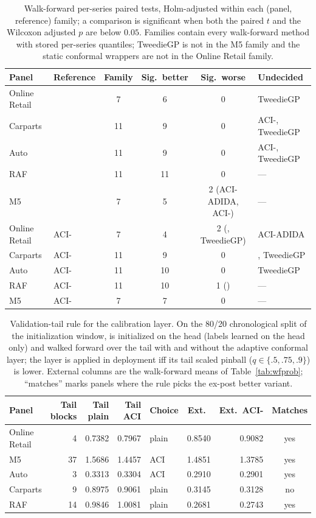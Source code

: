 \begin{table}[t]
\centering
\caption{Walk-forward per-series paired tests, Holm-adjusted within each
(panel, reference) family; a comparison is significant when both the
paired $t$ and the Wilcoxon adjusted $p$ are below $0.05$. Families
contain every walk-forward method with stored per-series quantiles;
TweedieGP is not in the M5 family and the static conformal wrappers are
not in the Online Retail family.}
\label{tab:wf-significance}
\small
\setlength{\tabcolsep}{5pt}
\begin{tabular}{llcccl}
\toprule
Panel & Reference & Family & Sig.\ better & Sig.\ worse & Undecided\\
\midrule
Online Retail & \EBB{} & 7 & 6 & 0 & TweedieGP\\
Carparts & \EBB{} & 11 & 9 & 0 & ACI-\EBB{}, TweedieGP\\
Auto & \EBB{} & 11 & 9 & 0 & ACI-\EBB{}, TweedieGP\\
RAF & \EBB{} & 11 & 11 & 0 & ---\\
M5 & \EBB{} & 7 & 5 & 2 (ACI-ADIDA, ACI-\EBB{}) & ---\\
Online Retail & ACI-\EBB{} & 7 & 4 & 2 (\EBB{}, TweedieGP) & ACI-ADIDA\\
Carparts & ACI-\EBB{} & 11 & 9 & 0 & \EBB{}, TweedieGP\\
Auto & ACI-\EBB{} & 11 & 10 & 0 & TweedieGP\\
RAF & ACI-\EBB{} & 11 & 10 & 1 (\EBB{}) & ---\\
M5 & ACI-\EBB{} & 7 & 7 & 0 & ---\\
\bottomrule
\end{tabular}
\end{table}

\begin{table}[t]
\centering
\caption{Validation-tail rule for the calibration layer. On the 80/20
chronological split of the initialization window, \EBB{} is initialized on
the head (labels learned on the head only) and walked forward over the
tail with and without the adaptive conformal layer; the layer is applied
in deployment iff its tail scaled pinball ($q\in\{.5,.75,.9\}$) is lower.
External columns are the walk-forward means of Table~\ref{tab:wfprob};
``matches'' marks panels where the rule picks the ex-post better variant.}
\label{tab:aci-rule}
\small
\setlength{\tabcolsep}{5pt}
\begin{tabular}{lrrrlrrc}
\toprule
Panel & Tail blocks & Tail plain & Tail ACI & Choice & Ext.\ \EBB{} & Ext.\ ACI-\EBB{} & Matches\\
\midrule
Online Retail & 4 & 0.7382 & 0.7967 & plain & 0.8540 & 0.9082 & yes\\
M5 & 37 & 1.5686 & 1.4457 & ACI & 1.4851 & 1.3785 & yes\\
Auto & 3 & 0.3313 & 0.3304 & ACI & 0.2910 & 0.2901 & yes\\
Carparts & 9 & 0.8975 & 0.9061 & plain & 0.3145 & 0.3128 & no\\
RAF & 14 & 0.9846 & 1.0081 & plain & 0.2681 & 0.2743 & yes\\
\bottomrule
\end{tabular}
\end{table}

